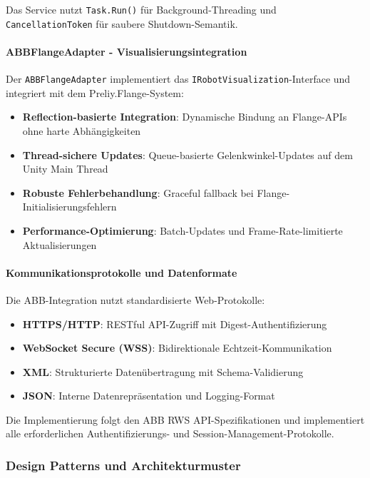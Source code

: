Das Service nutzt \texttt{Task.Run()} für Background-Threading und
\texttt{CancellationToken} für saubere Shutdown-Semantik.

\paragraph{ABBFlangeAdapter - Visualisierungsintegration}
Der \texttt{ABBFlangeAdapter} implementiert das
\texttt{IRobotVisualization}-Interface und integriert mit dem
Preliy.Flange-System:

\begin{itemize}
    \item \textbf{Reflection-basierte Integration}: Dynamische Bindung an Flange-APIs ohne harte Abhängigkeiten
    \item \textbf{Thread-sichere Updates}: Queue-basierte Gelenkwinkel-Updates auf dem Unity Main Thread
    \item \textbf{Robuste Fehlerbehandlung}: Graceful fallback bei Flange-Initialisierungsfehlern
    \item \textbf{Performance-Optimierung}: Batch-Updates und Frame-Rate-limitierte Aktualisierungen
\end{itemize}

\paragraph{Kommunikationsprotokolle und Datenformate}
Die ABB-Integration nutzt standardisierte Web-Protokolle:

\begin{itemize}
    \item \textbf{HTTPS/HTTP}: RESTful API-Zugriff mit Digest-Authentifizierung
    \item \textbf{WebSocket Secure (WSS)}: Bidirektionale Echtzeit-Kommunikation
    \item \textbf{XML}: Strukturierte Datenübertragung mit Schema-Validierung
    \item \textbf{JSON}: Interne Datenrepräsentation und Logging-Format
\end{itemize}

Die Implementierung folgt den ABB RWS API-Spezifikationen und implementiert
alle erforderlichen Authentifizierungs- und Session-Management-Protokolle.

\subsubsection{Design Patterns und Architekturmuster}

